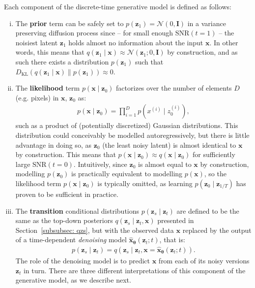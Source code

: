 Each component of the discrete-time generative model is defined as follows:
%
\begin{enumerate}[(i)]
    \item The \textbf{prior} term can be safely set to $p(\mathbf{z}_1) = \mathcal{N}\left(0, \mathbf{I}\right)$ in a variance preserving diffusion process since -- for small enough $\mathrm{SNR}(t=1)$ -- the noisiest latent $\mathbf{z}_1$ holds almost no information about the input $\mathbf{x}$. In other words, this means that $q(\mathbf{z}_1 \mid \mathbf{x}) \approx \mathcal{N}\left(\mathbf{z}_1; 0, \mathbf{I}\right)$ by construction, and as such there exists a distribution $p(\mathbf{z}_1)$ such that $D_{\mathrm{KL}}\left(q(\mathbf{z}_1 \mid \mathbf{x}) \parallel p(\mathbf{z}_1) \right) \approx 0$.
    \item The \textbf{likelihood} term $p(\mathbf{x} \mid \mathbf{z}_0)$ factorizes over the number of elements $D$ (e.g. pixels) in $\mathbf{x}$, $\mathbf{z}_0$ as:
    \begin{align}
        p(\mathbf{x} \mid \mathbf{z}_0) = \prod_{i=1}^D p({x}^{(i)} \mid {z}_0^{(i)}),
    \end{align}
    such as a product of (potentially discretized) Gaussian distributions. This distribution could conceivably be modelled autoregressively, but there is little advantage in doing so, as $\mathbf{z}_0$ (the least noisy latent) is almost identical to $\mathbf{x}$ by construction. This means that $p(\mathbf{x} \mid \mathbf{z}_0) \approx q(\mathbf{x} \mid \mathbf{z}_0)$ for sufficiently large $\mathrm{SNR}(t=0)$. Intuitively, since $\mathbf{z}_0$ is almost equal to $\mathbf{x}$ by construction, modelling $p(\mathbf{z}_0)$ is practically equivalent to modelling $p(\mathbf{x})$, so the likelihood term $p(\mathbf{x} \mid \mathbf{z}_0)$ is typically omitted, as learning $p(\mathbf{z}_0 \mid \mathbf{z}_{1/T})$ has proven to be sufficient in practice. 
    \newpage
    \item The \textbf{transition} conditional distributions $p(\mathbf{z}_s \mid \mathbf{z}_t)$ are defined to be the same as the top-down posteriors $q(\mathbf{z}_s \mid \mathbf{z}_t, \mathbf{x})$ presented in Section~\ref{subsubsec: qzs}, but with the observed data $\mathbf{x}$ replaced by the output of a time-dependent \textit{denoising} model $\hat{\mathbf{x}}_{\boldsymbol{\theta}}(\mathbf{z}_t;t)$, that is:
    \begin{align}
        p(\mathbf{z}_s \mid \mathbf{z}_t) = q(\mathbf{z}_s \mid \mathbf{z}_t, \mathbf{x} = \hat{\mathbf{x}}_{\boldsymbol{\theta}}(\mathbf{z}_t;t)).    
    \end{align}
    The role of the denoising model is to predict $\mathbf{x}$ from each of its noisy versions $\mathbf{z}_t$ in turn. There are three different interpretations of this component of the generative model, as we describe next.
\end{enumerate}
